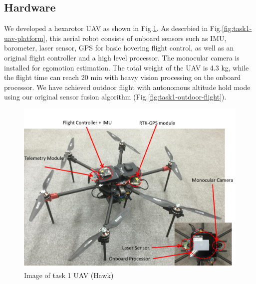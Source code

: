 \documentclass{standalone}
\begin{document}
\subsection{Hardware}

We developed a hexarotor UAV as shown in Fig.\ref{fig:task1-uav}. As descrbied in  Fig.\ref{fig:task1-uav-platform}, this aerial robot consists of onboard sensors such as IMU, barometer, laser sensor, GPS for basic hovering flight control, as well as an original flight controller and a high level processor. The monocular camera is installed for egomotion estimation. The total weight of the UAV is 4.3 kg, while the flight time can reach 20 min with heavy vision processing on the onboard processor. We have achieved outdoor flight with autonomous altitude hold mode using our original sensor fusion algorithm (Fig.\ref{fig:task1-outdoor-flight}).

\begin{figure}[h]
  \begin{center}
    \includegraphics[clip,  bb=0 0 710 502,  width=\columnwidth]{sections/task1/images/task1-tarrot680.pdf}
    \caption{Image of task 1 UAV (Hawk)}
    \label{fig:task1-uav}
  \end{center}
\end{figure} 
\end{document}
